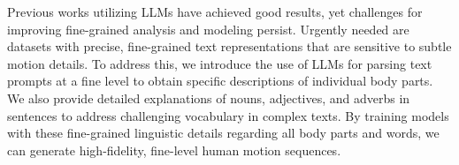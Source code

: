 Previous works utilizing LLMs have achieved good results, yet challenges for improving fine-grained analysis and modeling persist. Urgently needed are datasets with precise, fine-grained text representations that are sensitive to subtle motion details. To address this, we introduce the use of LLMs for parsing text prompts at a fine level to obtain specific descriptions of individual body parts. We also provide detailed explanations of nouns, adjectives, and adverbs in sentences to address challenging vocabulary in complex texts. By training models with these fine-grained linguistic details regarding all body parts and words, we can generate high-fidelity, fine-level human motion sequences.